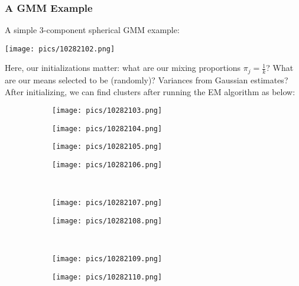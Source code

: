 \documentclass[11pt]{scrartcl}
\begin{document}
\subsubsection{A GMM Example}
A simple $3$-component spherical GMM example: 
\begin{center}
    \texttt{[image: pics/10282102.png]}
\end{center}
Here, our initializations matter: what are our mixing proportions $\pi_{j}=\frac{1}{k}$? What are our means selected to be (randomly)? Variances from Gaussian estimates? After initializing, we can find clusters after running the EM algorithm as below:
\begin{center}
\begin{figure}[H]
    \begin{subfigure}[b]{0.5\textwidth}
    \texttt{[image: pics/10282103.png]}
    \end{subfigure}%
    \begin{subfigure}[b]{0.5\textwidth}
    \texttt{[image: pics/10282104.png]}
    \end{subfigure}%
\end{figure}
\begin{figure}[H]
    \begin{subfigure}[b]{0.5\textwidth}
    \texttt{[image: pics/10282105.png]}
    \end{subfigure}%
    \begin{subfigure}[b]{0.5\textwidth}
    \texttt{[image: pics/10282106.png]}
    \end{subfigure} \\
    \begin{subfigure}[b]{0.5\textwidth}
    \texttt{[image: pics/10282107.png]}
    \end{subfigure}
    \begin{subfigure}[b]{0.5\textwidth}
    \texttt{[image: pics/10282108.png]}
    \end{subfigure} \\
    \begin{subfigure}[b]{0.5\textwidth}
    \texttt{[image: pics/10282109.png]}
    \end{subfigure}
    \begin{subfigure}[b]{0.5\textwidth}
    \texttt{[image: pics/10282110.png]}
    \end{subfigure}
\end{figure}
\caption{An Example of the EM algorithm on GMM}
\end{center}
\end{document}

